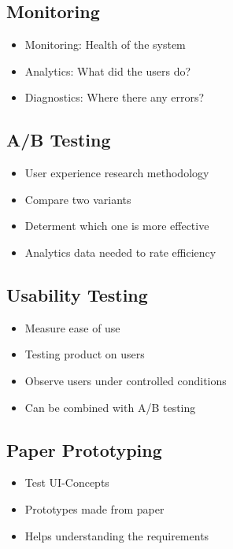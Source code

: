 \subsection{Monitoring}
\begin{itemize}
    \item Monitoring: Health of the system
    \item Analytics: What did the users do?
    \item Diagnostics: Where there any errors?
\end{itemize}

\subsection{A/B Testing}
\begin{itemize}
    \item User experience research methodology
    \item Compare two variants
    \item Determent which one is more effective
    \item Analytics data needed to rate efficiency
\end{itemize}

\subsection{Usability Testing}
\begin{itemize}
    \item Measure ease of use
    \item Testing product on users
    \item Observe users under controlled conditions
    \item Can be combined with A/B testing
\end{itemize}

\subsection{Paper Prototyping}
\begin{itemize}
    \item Test UI-Concepts
    \item Prototypes made from paper
    \item Helps understanding the requirements
\end{itemize}